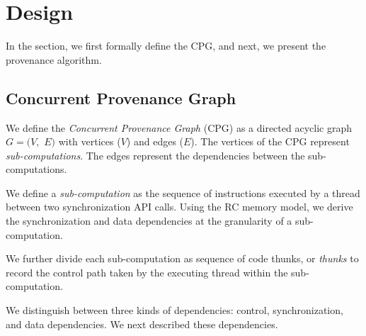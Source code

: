\section{Design}
\label{sec:algorithms}
In the section, we first formally define the CPG, and next, we present the provenance algorithm.

\subsection{Concurrent Provenance Graph}  We define the {\em
Concurrent Provenance Graph} (CPG)  as a directed acyclic graph $G =
(V,$ $E)$ with vertices ($V$) and edges ($E$). The
vertices of the CPG represent {\em sub-computations}. The edges represent the dependencies between the sub-computations. %

 We define a {\em sub-computation}  as the sequence of instructions
executed by a thread between two \pthreads synchronization API calls. Using the RC memory model, we derive the synchronization and data dependencies at the granularity of a sub-computation.



We further divide each sub-computation as sequence of code thunks, or {\em thunks} to record the control path taken by the executing thread within the sub-computation.


 We distinguish between three kinds of dependencies: control, synchronization, and data dependencies. We next described these dependencies.



 

